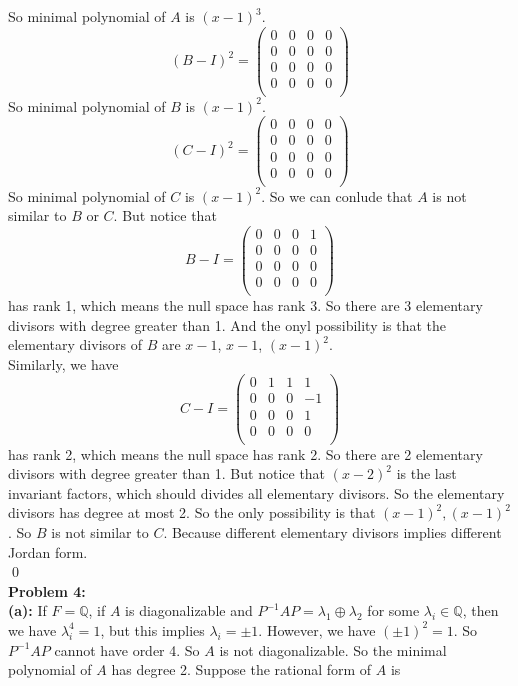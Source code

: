 \documentclass[12pt]{amsart}
\newcommand{\Q}{\mathbb{Q}}
\begin{document}
So minimal polynomial of $A$ is $(x-1)^3$.
\[(B-I)^2=\begin{pmatrix}
    0&0&0&0\\
    0&0&0&0\\
    0&0&0&0\\
    0&0&0&0\\
\end{pmatrix}\]
So minimal polynomial of $B$ is $(x-1)^2$.
\[(C-I)^2=\begin{pmatrix}
    0&0&0&0\\
    0&0&0&0\\
    0&0&0&0\\
    0&0&0&0\\
\end{pmatrix}\]
So minimal polynomial of $C$ is $(x-1)^2$.
So we can conlude that $A$ is not similar to $B$ or $C$. But notice that 
\[B-I=\begin{pmatrix}
    0&0&0&1\\
    0&0&0&0\\
    0&0&0&0\\
    0&0&0&0\\
\end{pmatrix}\]
has rank 1, which means the null space has rank 3. So there are 3 elementary divisors with degree greater than 1. And the onyl possibility is that the elementary divisors of $B$ are $x-1$, $x-1$, $(x-1)^2$. \\
Similarly, we have 
\[C-I=\begin{pmatrix}
    0&1&1&1\\
    0&0&0&-1\\
    0&0&0&1\\
    0&0&0&0\\
\end{pmatrix}\]
has rank 2, which means the null space has rank 2. So there are 2 elementary divisors with degree greater than 1. But notice that $(x-2)^2$ is the last invariant factors, which should divides all elementary divisors. So the elementary divisors has degree at most 2. So the only possibility is that $(x-1)^2,(x-1)^2$. So $B$ is not similar to $C$. Because different elementary divisors implies different Jordan form.
\\\qed\\
\textbf{Problem 4:}\\
\textbf{(a):} If $F=\Q$, if $A$ is diagonalizable and $P^{-1}AP=\lambda_1\oplus \lambda_2$ for some $\lambda_i\in\Q$, then we have $\lambda_i^4=1$, but this implies $\lambda_i=\pm1$. However, we have $(\pm1)^2=1$. So $P^{-1}AP$ cannot have order 4. So $A$ is not diagonalizable. So the minimal polynomial of $A$ has degree 2. Suppose the rational form of $A$ is 
\end{document}
